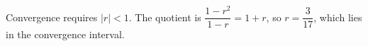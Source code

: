 Convergence requires $|r|<1 $. The quotient is $\dfrac{1-r^2}{1-r}=1+r $, so $\boxed{r=\dfrac{3}{17}}$, which lies in the convergence interval.
